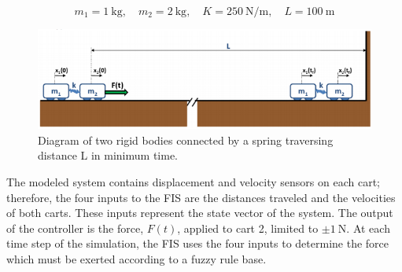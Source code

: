 \documentclass[submit]{aiaa-tc}%
\begin{document}
\begin{displaymath}
m_{1}=\SI{1}{\kilogram}, \quad
m_{2}=\SI{2}{\kilogram}, \quad
K = \SI{250}{\newton\per\metre}, \quad
L = \SI{100}{\metre}
\end{displaymath}

\begin{figure}
	\includegraphics{model.png}
	\caption{Diagram of two rigid bodies connected by a spring traversing distance \textrm{L} in minimum time.}
	\label{f:model}
\end{figure}

The modeled system contains displacement and velocity sensors on each cart; therefore, the four inputs to the FIS are the distances traveled and the velocities of both carts. These inputs represent the state vector of the system. The output of the controller is the force, $F(t)$, applied to cart 2, limited to $\pm \SI{1}{\newton}$. At each time step of the simulation, the FIS uses the four inputs to determine the force which must be exerted according to a fuzzy rule base. 
\end{document}
